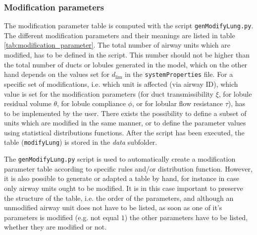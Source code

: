 \subsubsection{Modification parameters}
The modification parameter table is computed with the script \texttt{genModifyLung.py}.
The different modification parameters and their meanings are listed in table \ref{tab:modification_parameter}.
The total number of airway units which are modified, has to be defined in the script.
This number should not be higher than the total number of ducts or lobules generated in the model, which on the other hand depends on the values set for $d_\mathrm{lim}$ in the \texttt{systemProperties} file.
For a specific set of modifications, i.e. which unit is affected (via airway ID), which value is set for the modification parameters (for duct transmissibility $\xi$, for lobule residual volume $\theta$, for lobule compliance $\phi$, or for lobular flow resistance $\tau$), has to be implemented by the user.
There exists the possibility to define a subset of units which are modified in the same manner, or to define the parameter values using statistical distributions functions.
After the script has been executed, the table (\texttt{modifyLung}) is stored in the \textit{data} subfolder.

The \texttt{genModifyLung.py} script is used to automatically create a modification parameter table according to specific rules and/or distribution function.
However, it is also possible to generate or adapted a table by hand, for instance in case only airway units ought to be modified.
It is in this case important to preserve the structure of the table, i.e. the order of the parameters, and although an unmodified airway unit does not have to be listed, as soon as one of it's parameters is modified (e.g. not equal $1$) the other parameters have to be listed, whether they are modified or not.


